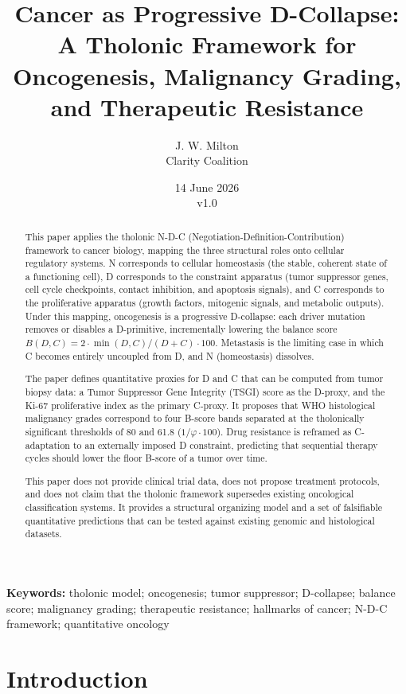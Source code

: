 \documentclass[12pt]{article}
\title{Cancer as Progressive D-Collapse:\\
\large A Tholonic Framework for Oncogenesis, Malignancy Grading, and Therapeutic Resistance}
\author{J. W. Milton\\[4pt]{\small Clarity Coalition}}
\date{\small 14 June 2026 \\ v1.0}
\begin{document}
\maketitle

\noindent\textbf{Keywords:} tholonic model; oncogenesis; tumor suppressor; D-collapse; balance score; malignancy grading; therapeutic resistance; hallmarks of cancer; N-D-C framework; quantitative oncology

\begin{abstract}
This paper applies the tholonic N-D-C
(Negotiation-Definition-Contribution) framework to cancer biology,
mapping the three structural roles onto cellular regulatory systems. N
corresponds to cellular homeostasis (the stable, coherent state of a
functioning cell), D corresponds to the constraint apparatus (tumor
suppressor genes, cell cycle checkpoints, contact inhibition, and
apoptosis signals), and C corresponds to the proliferative apparatus
(growth factors, mitogenic signals, and metabolic outputs). Under this
mapping, oncogenesis is a progressive D-collapse: each driver mutation
removes or disables a D-primitive, incrementally lowering the balance
score \(B(D,C) = 2 \cdot \min(D,C)/(D+C) \cdot 100\). Metastasis is the
limiting case in which C becomes entirely uncoupled from D, and N
(homeostasis) dissolves.

The paper defines quantitative proxies for D and C that can be computed
from tumor biopsy data: a Tumor Suppressor Gene Integrity (TSGI) score
as the D-proxy, and the Ki-67 proliferative index as the primary
C-proxy. It proposes that WHO histological malignancy grades correspond
to four B-score bands separated at the tholonically significant
thresholds of 80 and 61.8 (\(1/\varphi \cdot 100\)). Drug resistance is
reframed as C-adaptation to an externally imposed D constraint,
predicting that sequential therapy cycles should lower the floor B-score
of a tumor over time.

This paper does not provide clinical trial data, does not propose
treatment protocols, and does not claim that the tholonic framework
supersedes existing oncological classification systems. It provides a
structural organizing model and a set of falsifiable quantitative
predictions that can be tested against existing genomic and histological
datasets.
\end{abstract}

\section{Introduction}\label{introduction}
\end{document}

